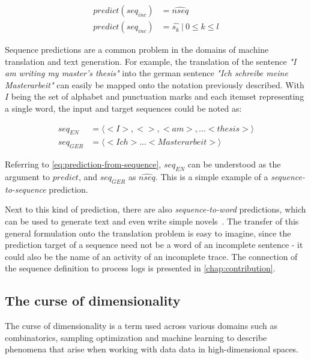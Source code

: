 \begin{equation}
\begin{split}
    predict(seq_{inc}) &= \widehat{nseq}\\
    predict(seq_{inc}) &= \hat{s_k}\ |\ 0 \leq k \leq l
\end{split}
\label{eq:prediction-from-sequence}
\end{equation}

Sequence predictions are a common problem in the domains of machine translation and text generation. For example, the translation of the sentence \textit{"I am writing my master's thesis"} into the german sentence \textit{"Ich schreibe meine Masterarbeit"} can easily be mapped onto the notation previously described. With $I$ being the set of alphabet and punctuation marks and each itemset representing a single word, the input and target sequences could be noted as:

\begin{equation*}
\begin{split}
seq_{EN} &= \langle<I>, < >, <am>, ... <thesis>\rangle\\
seq_{GER} &= \langle<Ich> ... <Masterarbeit>\rangle
\end{split}
\end{equation*}

Referring to \autoref{eq:prediction-from-sequence}, $seq_{EN}$ can be understood as the argument to $predict$, and $seq_{GER}$ as $\widehat{nseq}$. This is a simple example of a \textit{sequence-to-sequence} prediction.

Next to this kind of prediction, there are also \textit{sequence-to-word} predictions, which can be used to generate text and even write simple novels~\cite{web:text-generation-machinelearningmastery, web:text-generation-freecodecamp}. The transfer of this general formulation onto the translation problem is easy to imagine, since the prediction target of a sequence need not be a word of an incomplete sentence - it could also be the name of an activity of an incomplete trace. The connection of the sequence definition to process logs is presented in \autoref{chap:contribution}.

\subsection{The curse of dimensionality}
The curse of dimensionality is a term used across various domains such as combinatorics, sampling optimization and machine learning to describe phenomena that arise when working with data data in high-dimensional spaces.

